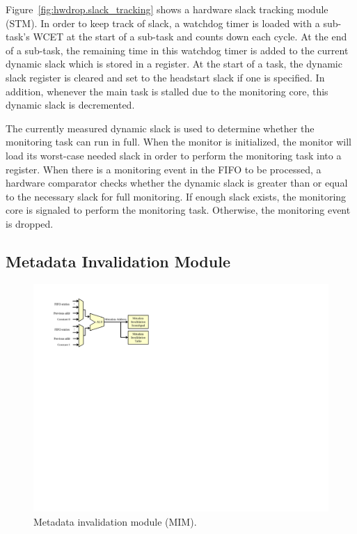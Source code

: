 Figure~\ref{fig:hwdrop.slack_tracking} shows a hardware slack tracking module
(STM). In order to keep track of slack, a watchdog timer is loaded with a
sub-task's WCET at the start of a sub-task and counts down each cycle. At the
end of a sub-task, the remaining time in this watchdog timer is added to the
current dynamic slack which is stored in a register. At the start of a task,
the dynamic slack register is cleared and set to the headstart slack if one is
specified.  In addition, whenever the main task is stalled due to the
monitoring core, this dynamic slack is decremented.

The currently measured dynamic slack is used to determine whether the
monitoring task can run in full. When the monitor is initialized, the monitor
will load its worst-case needed slack in order to perform the monitoring task
into a register. When there is a monitoring event in the FIFO to be processed,
a hardware comparator checks whether the dynamic slack is greater than or equal
to the necessary slack for full monitoring. If enough slack exists, the
monitoring core is signaled to perform the monitoring task. Otherwise, the
monitoring event is dropped.

\subsection{Metadata Invalidation Module}
\label{sec:hwdrop.drop}

\begin{figure}
  \begin{center}
    \includegraphics[width=\columnwidth]{monitoring_hard_drop/figs/mim.pdf}
    \caption{Metadata invalidation module (MIM).}
    \label{fig:hwdrop.mim}
  \end{center}
\end{figure}

